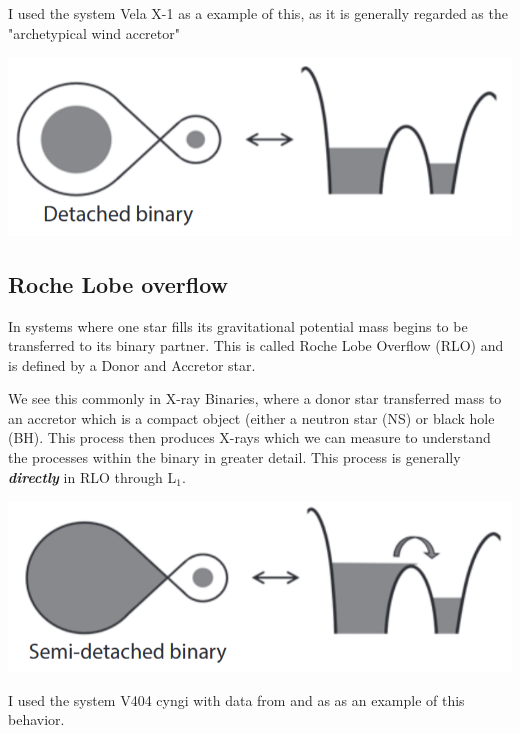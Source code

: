 \documentclass[12pt, letterpaper]{article}
\begin{document}
        I used the system Vela X-1 \cite{Kretschmar_2021} as a example of this, as it is generally regarded as the "archetypical wind accretor" \cite{Kretschmar_2021} 
        
        \begin{center}
            \includegraphics[scale = .4]{Figs/Detached binary.png}
        \end{center}
        
        \subsection{\centering Roche Lobe overflow} %
        In systems where one star fills its gravitational potential mass begins to be transferred to its binary partner. This is called Roche Lobe Overflow (RLO) and is defined by a Donor and Accretor star. 

        We see this commonly in X-ray Binaries, where a donor star transferred mass to an accretor which is a compact object (either a neutron star (NS) or black hole (BH). This process then produces X-rays which we can measure to understand the processes within the binary in greater detail. This process is generally \textbf{\textit{directly}} in RLO through L$_1$. 
        
       \begin{center}
            \includegraphics[scale = .4]{Figs/Semi-detached binary.png}
        \end{center}
        
        I used the system V404 cyngi with data from \cite{Bernardini_2016} and \cite{10.1093/mnras/271.1.L10} as as an example of this behavior. 
        
\end{document}
